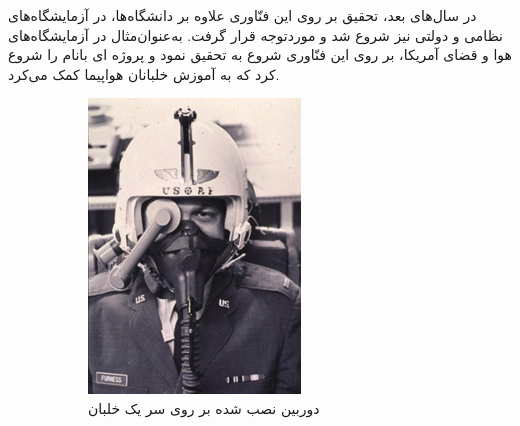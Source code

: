 در سال‌های بعد، تحقیق بر روی این فنّاوری علاوه بر دانشگاه‌ها، در آزمایشگاه‌های نظامی و دولتی نیز شروع شد و موردتوجه قرار گرفت. به‌عنوان‌مثال  در آزمایشگاه‌های هوا و قضای آمریکا، بر روی این فنّاوری شروع به تحقیق نمود و پروژه ای بانام  را شروع کرد که به آموزش خلبانان هواپیما کمک می‌کرد\cite{Furness}.
\begin{figure}
	\centering
	\begin{subfigure}[b]{0.4\textwidth}
		\includegraphics[width=\textwidth]{image/airforce1}
		\caption{دوربین نصب شده بر روی سر یک خلبان}
		\label{fig:gull}
	\end{subfigure}
	~ %
	\begin{subfigure}[b]{0.5\textwidth}

\end{subfigure}
\end{figure}
